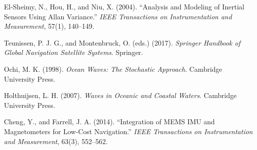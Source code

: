 \documentclass[10pt]{extarticle}
\begin{document}
\begin{thebibliography}{99}
El-Sheimy, N., Hou, H., and Niu, X. (2004).  
“Analysis and Modeling of Inertial Sensors Using Allan Variance.”  
\emph{IEEE Transactions on Instrumentation and Measurement}, 57(1), 140–149.

Teunissen, P. J. G., and Montenbruck, O. (eds.) (2017).  
\emph{Springer Handbook of Global Navigation Satellite Systems}.  
Springer.

Ochi, M. K. (1998).  
\emph{Ocean Waves: The Stochastic Approach}.  
Cambridge University Press.

Holthuijsen, L. H. (2007).  
\emph{Waves in Oceanic and Coastal Waters}.  
Cambridge University Press.

Cheng, Y., and Farrell, J. A. (2014).  
“Integration of MEMS IMU and Magnetometers for Low-Cost Navigation.”  
\emph{IEEE Transactions on Instrumentation and Measurement}, 63(3), 552–562.

\end{thebibliography}
\end{document}
